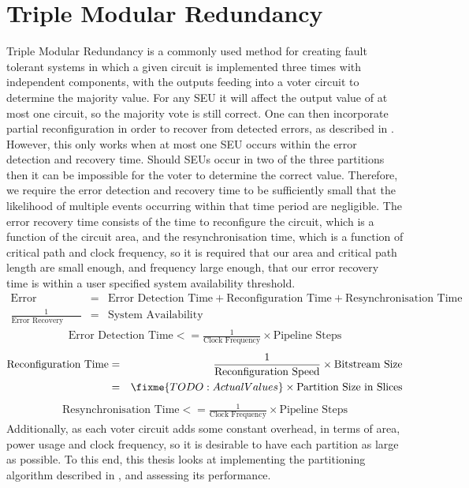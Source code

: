 \documentclass[12pt,drafta4paper,oneside]{memoir} %
\begin{document}
\section{Triple Modular Redundancy}
Triple Modular Redundancy is a commonly used method for creating fault tolerant systems in which a given circuit is implemented three times with independent components, with the outputs feeding into a voter circuit to determine the majority value. For any \ac{SEU} it will affect the output value of at most one circuit, so the majority vote is still correct. One can then incorporate partial reconfiguration in order to recover from detected errors, as described in . However, this only works when at most one \ac{SEU} occurs within the error detection and recovery time. Should \acp{SEU} occur in two of the three partitions then it can be impossible for the voter to determine the correct value. Therefore, we require the error detection and recovery time to be sufficiently small that the likelihood of multiple events occurring within that time period are negligible.
The error recovery time consists of the time to reconfigure the circuit, which is a function of the circuit area, and the resynchronisation time, which is a function of critical path and clock frequency, so it is required that our area and critical path length are small enough, and frequency large enough, that our error recovery time is within a user specified system availability threshold.
\begin{eqnarray*}
    \mbox{Error Recovery Time} &=& \mbox{Error Detection Time} + \mbox{Reconfiguration Time} + \mbox{Resynchronisation Time}\\
    \frac{1}{\mbox{Error Recovery Time}} &=& \mbox{System Availability}
\end{eqnarray*}
\begin{eqnarray*}
    \mbox{Error Detection Time} <= \frac{1}{\mbox{Clock Frequency}}\times\mbox{Pipeline Steps}
\end{eqnarray*}
\begin{eqnarray*}
    \mbox{Reconfiguration Time} &=& \frac{1}{\mbox{Reconfiguration Speed}}\times\mbox{Bitstream Size}\\
     &=& \fixme{TODO: Actual Values}\times\mbox{Partition Size in Slices}
\end{eqnarray*}
\begin{eqnarray*}
    \mbox{Resynchronisation Time} <= \frac{1}{\mbox{Clock Frequency}}\times\mbox{Pipeline Steps}
\end{eqnarray*}
Additionally, as each voter circuit adds some constant overhead, in terms of area, power usage and clock frequency, so it is desirable to have each partition as large as possible. To this end, this thesis looks at implementing the partitioning algorithm described in , and assessing its performance.
\end{document}
